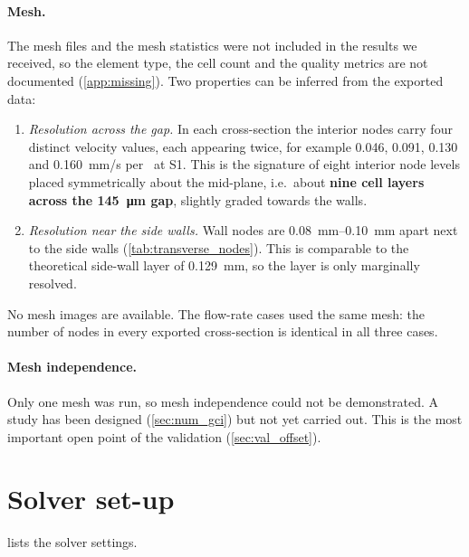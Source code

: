 \paragraph{Mesh.} The mesh files and the mesh statistics were not included in the results we received, so the element type, the cell count and the quality metrics are not documented (\cref{app:missing}). Two properties can be inferred from the exported data:
\begin{enumerate}
\item \emph{Resolution across the gap.} In each cross-section the interior nodes carry four distinct velocity values, each appearing twice, for example 0.046, 0.091, 0.130 and \SI{0.160}{mm/s} per \ulmin\ at S1. This is the signature of eight interior node levels placed symmetrically about the mid-plane, i.e.\ about \textbf{nine cell layers across the \SI{145}{\micro\metre} gap}, slightly graded towards the walls.
\item \emph{Resolution near the side walls.} Wall nodes are \SIrange{0.08}{0.10}{mm} apart next to the side walls (\cref{tab:transverse_nodes}). This is comparable to the theoretical side-wall layer of \SI{0.129}{mm}, so the layer is only marginally resolved.
\end{enumerate}
No mesh images are available. The flow-rate cases used the same mesh: the number of nodes in every exported cross-section is identical in all three cases.

\paragraph{Mesh independence.} Only one mesh was run, so mesh independence could not be demonstrated. A study has been designed (\cref{sec:num_gci}) but not yet carried out. This is the most important open point of the validation (\cref{sec:val_offset}).

\section{Solver set-up}
\label{sec:num_solver}

 lists the solver settings.

